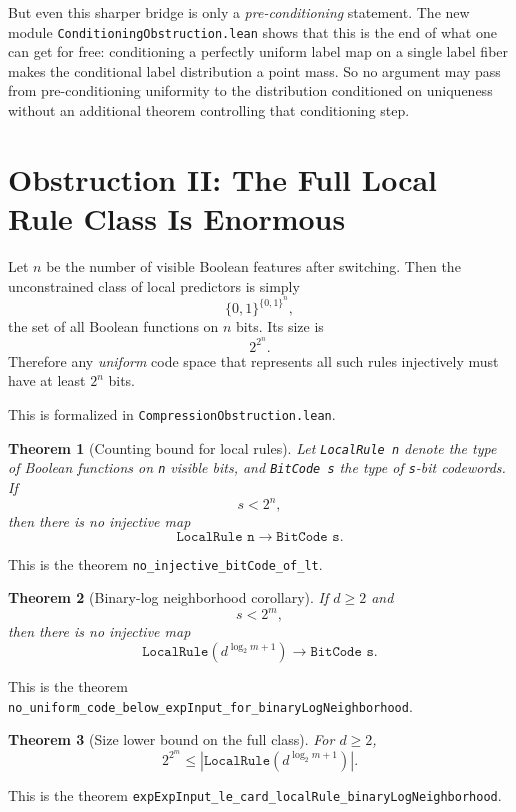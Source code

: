 \documentclass[11pt]{article}
\newtheorem{theorem}{Theorem}[section]
\theoremstyle{remark}
\begin{document}
But even this sharper bridge is only a \emph{pre-conditioning} statement.  The new module
\texttt{ConditioningObstruction.lean} shows that this is the end of what one can get for free:
conditioning a perfectly uniform label map on a single label fiber makes the conditional label
distribution a point mass.  So no argument may pass from pre-conditioning uniformity to the
distribution conditioned on uniqueness without an additional theorem controlling that conditioning
step.

\section{Obstruction II: The Full Local Rule Class Is Enormous}

Let $n$ be the number of visible Boolean features after switching.  Then the unconstrained class of
local predictors is simply
\[
  \{0,1\}^{\{0,1\}^n},
\]
the set of all Boolean functions on $n$ bits.  Its size is
\[
  2^{2^n}.
\]
Therefore any \emph{uniform} code space that represents all such rules injectively must have at
least $2^n$ bits.

This is formalized in \texttt{CompressionObstruction.lean}.

\begin{theorem}[Counting bound for local rules]
Let \texttt{LocalRule n} denote the type of Boolean functions on \texttt{n} visible bits, and
\texttt{BitCode s} the type of \texttt{s}-bit codewords.  If
\[
  s < 2^n,
\]
then there is no injective map
\[
  \texttt{LocalRule n} \to \texttt{BitCode s}.
\]
\end{theorem}

\noindent
This is the theorem \texttt{no\_injective\_bitCode\_of\_lt}.

\begin{theorem}[Binary-log neighborhood corollary]
If $d \ge 2$ and
\[
  s < 2^m,
\]
then there is no injective map
\[
  \texttt{LocalRule}\!\left(d^{\log_2 m + 1}\right) \to \texttt{BitCode s}.
\]
\end{theorem}

\noindent
This is the theorem
\texttt{no\_uniform\_code\_below\_expInput\_for\_binaryLogNeighborhood}.

\begin{theorem}[Size lower bound on the full class]
For $d \ge 2$,
\[
  2^{2^m} \le
  \left|\texttt{LocalRule}\!\left(d^{\log_2 m + 1}\right)\right|.
\]
\end{theorem}

\noindent
This is the theorem
\texttt{expExpInput\_le\_card\_localRule\_binaryLogNeighborhood}.
\end{document}
